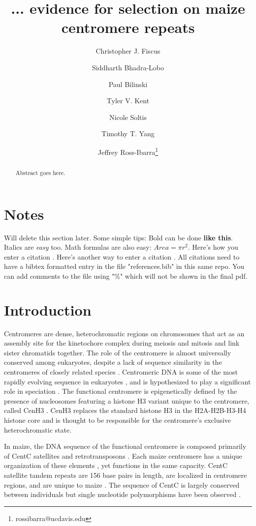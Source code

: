 \documentclass[12pt]{article}
\title{... evidence for selection on maize centromere repeats}
\author[1]{Christopher J. Fiscus}
\author[1]{Siddharth Bhadra-Lobo}
\author[1]{Paul Bilinski}
\author[1]{Tyler V. Kent}
\author[1]{Nicole Soltis}
\author[1]{Timothy T. Yang}
\author[1,2]{Jeffrey Ross-Ibarra\thanks{rossibarra@ucdavis.edu}}
\affil[1]{Department of Plant Sciences, University of California Davis}
\affil[2]{Center for Population Biology and Genome Center, University of California Davis}
\date{}
\begin{document}
\maketitle

\begin{abstract}
Abstract goes here.
\end{abstract}

\begin{footnotesize}
\end{footnotesize}

\section*{Notes}

Will delete this section later.  Some simple tips:
Bold can be done {\bf like this}.  Italics are \emph{easy} too.  Math formulas are also easy: $Area=\pi r^2$.
Here's how you enter a citation \cite{Wolfgruber2009}.
Here's another way to enter a citation \citep{Wolfgruber2009}.
All citations need to have a bibtex formatted entry in the file "references.bib" in this same repo. You can add comments to the file using "\%" which will not be shown in the final pdf.  

\section{Introduction}

Centromeres are dense, heterochromatic regions on chromosomes that act as an assembly site for the kinetochore complex during meiosis and mitosis and link sister chromatids together.  The role of the centromere is almost universally conserved among eukaryotes, despite a lack of sequence similarity in the centromeres of closely related species \cite{Henikoff2001}.  Centromeric DNA is some of the most rapidly evolving sequence in eukaryotes \cite{Csink1998}, \cite{Henikoff2001} and is hypothesized to play a significant role in speciation \cite{Henikoff2001}.  The functional centromere is epigenetically defined by the presence of nucleosomes featuring a histone H3 variant unique to the centromere, called CenH3 \cite{Henikoff2001}.  CenH3 replaces the standard histone H3 in the H2A-H2B-H3-H4 histone core and is thought to be responsible for the centromere's exclusive heterochromatic state. 

In maize, the DNA sequence of the functional centromere is composed primarily of CentC satellites and retrotransposons \cite{Nagaki2003}.  Each maize centromere has a unique organization of these elements \cite{Ananiev1998}, yet functions in the same capacity.  CentC satellite tandem repeats are 156 base pairs in length, are localized in centromere regions, and are unique to maize \cite{Ananiev1998}.  The sequence of CentC is largely conserved between individuals but single nucleotide polymorphisms have been observed \cite{Ananiev1998}.  
\end{document}
